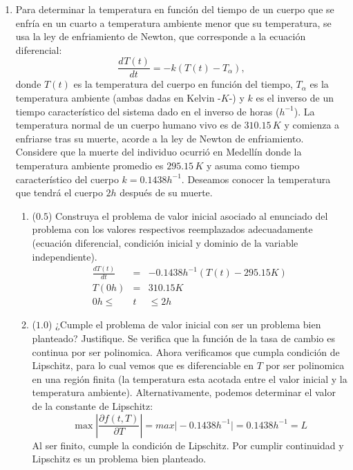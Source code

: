 \documentclass[12pt]{article}
\newcommand{\diff}[3]{\frac{d^{#3} #1}{d#2^{#3}}}
\begin{document}
\vspace{-.5cm}
  \begin{enumerate}[leftmargin=*,widest=9]
    \item Para determinar la temperatura en función del tiempo de un cuerpo que se enfría en un cuarto a temperatura ambiente menor que su temperatura, se usa la ley de enfriamiento de Newton, que corresponde a la ecuación diferencial:
    \[
    \diff{T(t)}{t}{} = -k(T(t) - T_{\alpha}),
    \]
    donde \(T(t)\) es la temperatura del cuerpo en función del tiempo, \(T_{\alpha}\) es la temperatura ambiente (ambas dadas en Kelvin -\(K\)-) y \(k\) es el inverso de un tiempo característico del sistema dado en el inverso de horas (\(h^{-1}\)).
    La temperatura normal de un cuerpo humano vivo es de \(310.15\,K\) y comienza a enfriarse tras su muerte, acorde a la ley de Newton de enfriamiento. Considere que la muerte del individuo ocurrió en Medellín donde la temperatura ambiente promedio es \(295.15\,K\) y asuma como tiempo característico del cuerpo \(k= 0.1438h^{-1}\). Deseamos conocer la temperatura que tendrá el cuerpo \(2h\) después de su muerte.
   \begin{enumerate}[label=\alph*]
    \item (\(0.5\)) Construya el problema de valor inicial asociado al enunciado del problema con los valores respectivos reemplazados adecuadamente (ecuación diferencial, condición inicial y dominio de la variable independiente).
    \begin{eqnarray*}
    \frac{dT(t)}{dt} &=& -0.1438 h^{-1} (T(t) - 295.15K)\\
    T(0h) &=& 310.15K \\
    0h \leq & t & \leq 2h
    \end{eqnarray*}
    \item (\(1.0\)) ¿Cumple el problema de valor inicial con ser un problema bien planteado? Justifique.
    Se verifica que la función de la tasa de cambio es continua por ser polinomica. Ahora verificamos que cumpla condición de Lipschitz, para lo cual vemos que es diferenciable en $T$ por ser polinomica en una región finita (la temperatura esta acotada entre el valor inicial y la temperatura ambiente). Alternativamente, podemos determinar el valor de la constante de Lipschitz:
    \begin{equation*}
    \max \left\vert \frac{\partial f(t, T)}{\partial T} \right\vert = max \vert -0.1438h^{-1}\vert = 0.1438 h^{-1} = L
    \end{equation*}
    Al ser finito, cumple la condición de Lipschitz. Por cumplir continuidad y Lipschitz es un problema bien planteado.

\end{enumerate}
\end{enumerate}
\end{document}
